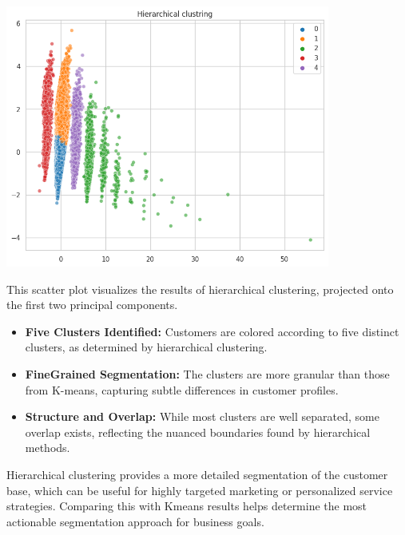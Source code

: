 \documentclass[a4paper]{article}
\begin{document}
\begin{multicols}{2}
\noindent
\begin{minipage}{\columnwidth}
\centering
\includegraphics[width=0.8\textwidth]{Hierarchical clustring.png}
\label{fig:pca_hierarchical}
\end{minipage}

This scatter plot visualizes the results of hierarchical clustering, projected onto the first two principal components.

\begin{itemize}
    \item \textbf{Five Clusters Identified:} Customers are colored according to five distinct clusters, as determined by hierarchical clustering.
    \item \textbf{Fine\-Grained Segmentation:} The clusters are more granular than those from K-means, capturing subtle differences in customer profiles.
    \item \textbf{Structure and Overlap:} While most clusters are well separated, some overlap exists, reflecting the nuanced boundaries found by hierarchical methods.
\end{itemize}

Hierarchical clustering provides a more detailed segmentation of the customer base, which can be useful for highly targeted marketing or personalized service strategies. Comparing this with K\-means results helps determine the most actionable segmentation approach for business goals.




\end{multicols}
\end{document}
